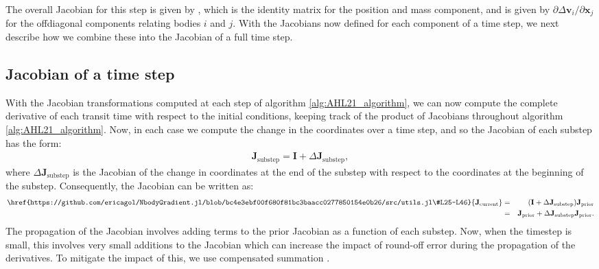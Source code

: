 \documentclass[fleqn,usenatbib,twocolumn]{mnras}
\newcommand   {\change}[1] {{\color{black}{#1}}}
\begin{document}
\change{\begin{eqnarray}\label{eqn:correction_fastkick}
\href{}{\Delta {\bf v}_i} &=& \frac{h^3}{36} \sum_{i,j \in A^C} \frac{G m_j}{r_{ij}^5} \left[3\mathbf{x}_{ij}(\mathbf{a}_{ij}\cdot \mathbf{x}_{ij})-\mathbf{a}_{ij}r_{ij}^2\right],
\end{eqnarray}}
\change{where the sum is taken only over pairs in $A^C$.  The derivatives are computed in a manner similar to that described in the prior sub-section.}

The overall Jacobian for this step is given by \change{$\mathbf{I}+\Delta{\bf J}_\mathrm{4th}(h)$},
which is the identity matrix for the position and mass component,
and is given by $\partial{\Delta \mathbf{v}_i}/\partial \mathbf{x}_j$
for the offdiagonal components relating bodies $i$ and $j$. \change{The time derivatives are straightforward as they involve derivatives with respect to $h^3$, and so involve the same formulae multiplied by $3/h$.}
With the Jacobians now defined for each component of a time step, we next describe how we combine these into the Jacobian of a full time step.

\subsection{Jacobian of a time step} \label{sec:Jacobian}

With the Jacobian transformations computed at each step of algorithm
\ref{alg:AHL21_algorithm}, we can now compute the complete derivative of each transit
time with respect to the initial conditions, keeping track of the product of
Jacobians throughout algorithm \ref{alg:AHL21_algorithm}.  Now, in each case we compute the
change in the coordinates over a time step, and so the Jacobian of each substep
has the form:
\begin{eqnarray}
    \mathbf{J}_\mathrm{substep} = \mathbf{I} + \Delta \mathbf{J}_\mathrm{substep},
\end{eqnarray}
where $\Delta \mathbf{J}_\mathrm{substep}$ is the Jacobian of the change in
coordinates at the end of the substep with respect to the coordinates
at the beginning of the substep.  Consequently, the Jacobian can be written
as:
\begin{eqnarray}\label{eqn:substep_jacobian}
    \href{https://github.com/ericagol/NbodyGradient.jl/blob/bc4e3ebf00f680f81bc3baacc0277850154e0b26/src/utils.jl\#L25-L46}{\mathbf{J}_\mathrm{current}} &=& (\mathbf{I} + \Delta \mathbf{J}_\mathrm{substep}) \mathbf{J}_\mathrm{prior}\cr
    &=& \mathbf{J}_\mathrm{prior} + \Delta \mathbf{J}_\mathrm{substep} \mathbf{J}_\mathrm{prior}.
\end{eqnarray}
The propagation of the Jacobian involves adding
terms to the prior Jacobian as a function of each substep.  Now, when
the timestep is small, this involves very small additions to the Jacobian
which can increase the impact of round-off error during the propagation
of the derivatives.  To mitigate the impact of this, we use compensated
summation \citep{Kahan1965}.
\end{document}
